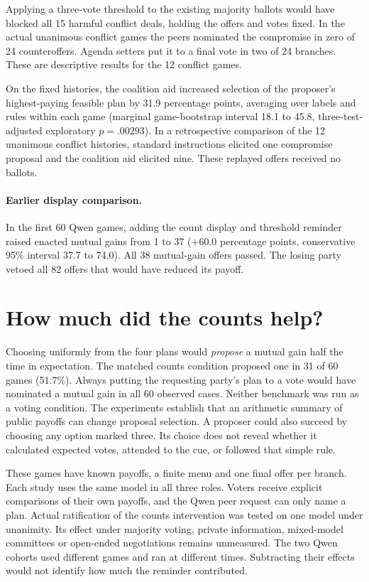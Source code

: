 \documentclass[11pt]{article}
\begin{document}
Applying a three-vote threshold to the existing majority ballots would have blocked all 15 harmful conflict deals, holding the offers and votes fixed. In the actual unanimous conflict games the peers nominated the compromise in zero of 24 counteroffers. Agenda setters put it to a final vote in two of 24 branches. These are descriptive results for the 12 conflict games.

On the fixed histories, the coalition aid increased selection of the proposer's highest-paying feasible plan by 31.9 percentage points, averaging over labels and rules within each game (marginal game-bootstrap interval 18.1 to 45.8, three-test-adjusted exploratory \(p=.00293\)). In a retrospective comparison of the 12 unanimous conflict histories, standard instructions elicited one compromise proposal and the coalition aid elicited nine. These replayed offers received no ballots.

\paragraph{Earlier display comparison.} In the first 60 Qwen games, adding the count display and threshold reminder raised enacted mutual gains from 1 to 37 (+60.0 percentage points, conservative 95\% interval 37.7 to 74.0). All 38 mutual-gain offers passed. The losing party vetoed all 82 offers that would have reduced its payoff.

\section{How much did the counts help?}

Choosing uniformly from the four plans would \emph{propose} a mutual gain half the time in expectation. The matched counts condition proposed one in 31 of 60 games (51.7\%). Always putting the requesting party's plan to a vote would have nominated a mutual gain in all 60 observed cases. Neither benchmark was run as a voting condition. The experiments establish that an arithmetic summary of public payoffs can change proposal selection. A proposer could also succeed by choosing any option marked three. Its choice does not reveal whether it calculated expected votes, attended to the cue, or followed that simple rule.

These games have known payoffs, a finite menu and one final offer per branch. Each study uses the same model in all three roles. Voters receive explicit comparisons of their own payoffs, and the Qwen peer request can only name a plan. Actual ratification of the counts intervention was tested on one model under unanimity. Its effect under majority voting, private information, mixed-model committees or open-ended negotiations remains unmeasured. The two Qwen cohorts used different games and ran at different times. Subtracting their effects would not identify how much the reminder contributed.
\end{document}
